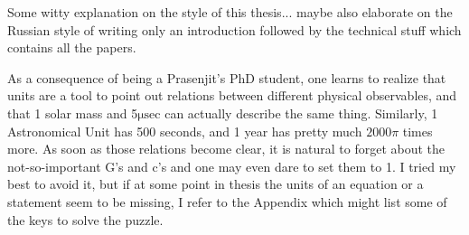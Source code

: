 Some witty explanation on the style of this thesis...  maybe also elaborate on
the Russian style of writing only an introduction followed by the technical
stuff which contains all the papers.   

As a consequence of being a Prasenjit's PhD student, one learns to realize that
units are a tool to point out relations between different physical observables,
and that 1 solar mass and 5$\mathrm{\mu sec}$ can actually describe the same
thing.  Similarly, 1 Astronomical Unit has 500 seconds, and 1 year has pretty
much $2000\pi$ times more.  As soon as those relations become clear, it is
natural to forget about the not-so-important G's and c's and one may even dare
to set them to 1.  I tried my best to avoid it, but if at some point in thesis
the units of an equation or a statement seem to be missing, I refer to the
Appendix which might list some of the keys to solve the puzzle.
